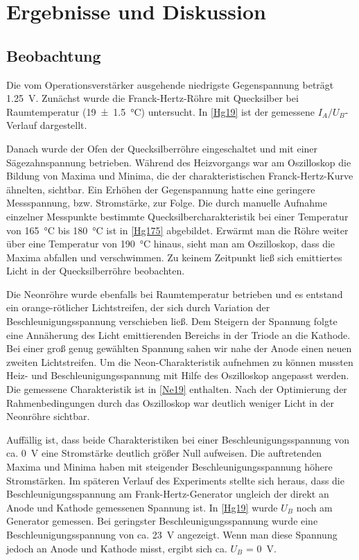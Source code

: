 \documentclass[
	a4paper,
	12pt,
	pagesize,
	ngerman
]{scrartcl}
\begin{document}
	\section{Ergebnisse und Diskussion}
	

	\subsection{Beobachtung}
	Die vom Operationsverstärker ausgehende niedrigste Gegenspannung beträgt \SI{1,25}{V}. Zunächst wurde die Franck-Hertz-Röhre mit Quecksilber bei Raumtemperatur (\SI{19 +- 1,5}{\degreeCelsius}) untersucht. In \cref{Hg19} ist der gemessene $I_A/U_B$-Verlauf dargestellt.
	
	Danach wurde der Ofen der Quecksilberröhre eingeschaltet und mit einer Sägezahnspannung betrieben. %
	Während des Heizvorgangs war am Oszilloskop die Bildung von Maxima und Minima, die der charakteristischen Franck-Hertz-Kurve ähnelten, sichtbar. %
	Ein Erhöhen der Gegenspannung hatte eine geringere Messspannung, bzw. Stromstärke, zur Folge.
	Die durch manuelle Aufnahme einzelner Messpunkte bestimmte Quecksilbercharakteristik bei einer Temperatur von \SI{165}{\degreeCelsius} bis \SI{180}{\degreeCelsius} ist in \cref{Hg175} abgebildet.
	Erwärmt man die Röhre weiter über eine Temperatur von \SI{190}{\degreeCelsius} hinaus, sieht man am Oszilloskop, dass die Maxima abfallen und verschwimmen.
	Zu keinem Zeitpunkt ließ sich emittiertes Licht in der Quecksilberröhre beobachten.
	
	Die Neonröhre wurde ebenfalls bei Raumtemperatur betrieben und es entstand ein orange-rötlicher Lichtstreifen, der sich durch Variation der Beschleunigungsspannung verschieben ließ. 
	Dem Steigern der Spannung folgte eine Annäherung des Licht emittierenden Bereichs in der Triode an die Kathode.
	Bei einer groß genug gewählten Spannung sahen wir nahe der Anode einen neuen zweiten Lichtstreifen.
	Um die Neon-Charakteristik aufnehmen zu können mussten Heiz- und Beschleunigungsspannung mit Hilfe des Oszilloskop angepasst werden.
	Die gemessene Charakteristik ist in \cref{Ne19} enthalten. Nach der Optimierung der Rahmenbedingungen durch das Oszilloskop war deutlich weniger Licht in der Neonröhre sichtbar.
	
	Auffällig ist, dass beide Charakteristiken bei einer Beschleunigungsspannung von ca. \SI{0}{V} eine Stromstärke deutlich größer Null aufweisen. 
	Die auftretenden Maxima und Minima haben mit steigender Beschleunigungsspannung höhere Stromstärken.
	Im späteren Verlauf des Experiments stellte sich heraus, dass die Beschleunigungsspannung am Frank-Hertz-Generator ungleich der direkt an Anode und Kathode gemessenen Spannung ist.
	In \cref{Hg19} wurde $U_B$ noch am Generator gemessen.
	Bei geringster Beschleunigungsspannung wurde eine Beschleunigungsspannung von ca. \SI{23}{V} angezeigt.
	Wenn man diese Spannung jedoch an Anode und Kathode misst, ergibt sich ca. $U_B$ = \SI{0}{V}.
	
\end{document}
